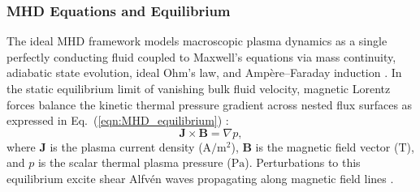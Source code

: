 \subsubsection{MHD Equations and Equilibrium}
The ideal MHD framework models macroscopic plasma dynamics as a single perfectly conducting fluid coupled to Maxwell's equations via mass continuity, adiabatic state evolution, ideal Ohm's law, and Amp\`ere--Faraday induction \cite{zheng, chen2016introduction}. In the static equilibrium limit of vanishing bulk fluid velocity, magnetic Lorentz forces balance the kinetic thermal pressure gradient across nested flux surfaces as expressed in Eq.~(\ref{eqn:MHD_equilibrium}) \cite{zheng, chen2016introduction}:
\begin{equation}
\label{eqn:MHD_equilibrium}
\mathbf{J} \times \mathbf{B} = \nabla p,
\end{equation}
\noindent where $\mathbf{J}$ is the plasma current density ($\mathrm{A/m^2}$), $\mathbf{B}$ is the magnetic field vector ($\mathrm{T}$), and $p$ is the scalar thermal plasma pressure ($\mathrm{Pa}$). Perturbations to this equilibrium excite shear Alfv\'en waves propagating along magnetic field lines \cite{zheng, chen2016introduction}.

